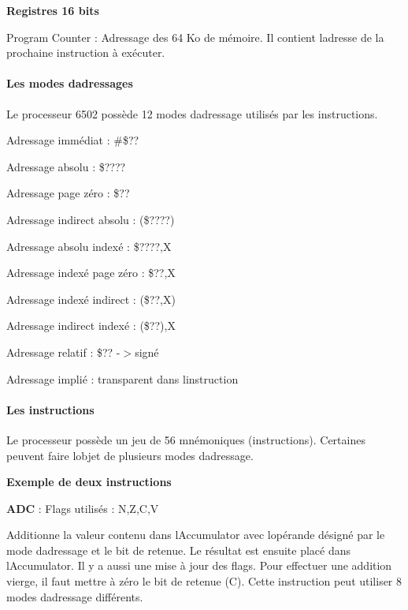 {\bfseries Registres 16 bits}
\begin{DoxyItemize}
\item Program Counter \+: Adressage des 64 Ko de mémoire. Il contient l\textquotesingle{}adresse de la prochaine instruction à exécuter.
\end{DoxyItemize}

\paragraph*{Les modes d\textquotesingle{}adressages}

Le processeur 6502 possède 12 modes d\textquotesingle{}adressage utilisés par les instructions.


\begin{DoxyItemize}
\item Adressage immédiat \+: \#\$??
\item Adressage absolu \+: \$????
\item Adressage page zéro \+: \$??
\item Adressage indirect absolu \+: (\$????)
\item Adressage absolu indexé \+: \$????,X
\item Adressage indexé page zéro \+: \$??,X
\item Adressage indexé indirect \+: (\$??,X)
\item Adressage indirect indexé \+: (\$??),X
\item Adressage relatif \+: \$?? -\/$>$signé
\item Adressage implié \+: transparent dans l\textquotesingle{}instruction
\end{DoxyItemize}

\paragraph*{Les instructions}

Le processeur possède un jeu de 56 mnémoniques (instructions). Certaines peuvent faire l\textquotesingle{}objet de plusieurs modes d\textquotesingle{}adressage.

{\bfseries Exemple de deux instructions}

{\bfseries A\+DC} \+: Flags utilisés \+: N,Z,C,V

Additionne la valeur contenu dans l\textquotesingle{}Accumulator avec l\textquotesingle{}opérande désigné par le mode d\textquotesingle{}adressage et le bit de retenue. Le résultat est ensuite placé dans l\textquotesingle{}Accumulator. Il y a aussi une mise à jour des flags. Pour effectuer une addition vierge, il faut mettre à zéro le bit de retenue (C). Cette instruction peut utiliser 8 modes d\textquotesingle{}adressage différents.

